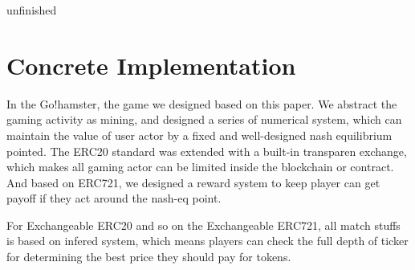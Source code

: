 \documentclass[twocolumn]{article}
\begin{document}
unfinished

\section {Concrete Implementation}

In the Go!hamster, the game we designed based on this paper. We abstract the gaming activity as mining, and designed a series of numerical system, which can maintain the value of user actor by a fixed and well-designed nash equilibrium pointed. The ERC20 standard was extended with a built-in transparen exchange, which makes all gaming actor can be limited inside the blockchain or contract. And based on ERC721, we designed a reward system to keep player can get payoff if they act around the nash-eq point.

For Exchangeable ERC20 and so on the Exchangeable ERC721, all match stuffs is based on infered system, which means players can check the full depth of ticker for determining the best price they should pay for tokens.



\end{document}
